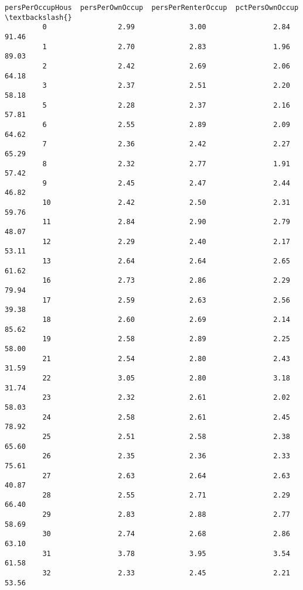 \documentclass[11pt]{llncs}
\begin{document}
\begin{Verbatim}[commandchars=\\\{\}]
               persPerOccupHous  persPerOwnOccup  persPerRenterOccup  pctPersOwnOccup  \textbackslash{}
         0                 2.99             3.00                2.84            91.46   
         1                 2.70             2.83                1.96            89.03   
         2                 2.42             2.69                2.06            64.18   
         3                 2.37             2.51                2.20            58.18   
         5                 2.28             2.37                2.16            57.81   
         6                 2.55             2.89                2.09            64.62   
         7                 2.36             2.42                2.27            65.29   
         8                 2.32             2.77                1.91            57.42   
         9                 2.45             2.47                2.44            46.82   
         10                2.42             2.50                2.31            59.76   
         11                2.84             2.90                2.79            48.07   
         12                2.29             2.40                2.17            53.11   
         13                2.64             2.64                2.65            61.62   
         16                2.73             2.86                2.29            79.94   
         17                2.59             2.63                2.56            39.38   
         18                2.60             2.69                2.14            85.62   
         19                2.58             2.89                2.25            58.00   
         21                2.54             2.80                2.43            31.59   
         22                3.05             2.80                3.18            31.74   
         23                2.32             2.61                2.02            58.03   
         24                2.58             2.61                2.45            78.92   
         25                2.51             2.58                2.38            65.60   
         26                2.35             2.36                2.33            75.61   
         27                2.63             2.64                2.63            40.87   
         28                2.55             2.71                2.29            66.40   
         29                2.83             2.88                2.77            58.69   
         30                2.74             2.68                2.86            63.10   
         31                3.78             3.95                3.54            61.58   
         32                2.33             2.45                2.21            53.56   

\end{Verbatim}
\end{document}
